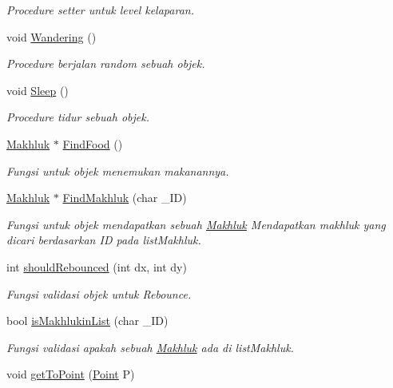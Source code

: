\begin{DoxyCompactItemize}
\begin{DoxyCompactList}\small\item\em Procedure setter untuk level kelaparan. \end{DoxyCompactList}\item 
void \hyperlink{class_hewan_a8268bfb533b9becb62e2bd8eee2e7960}{Wandering} ()
\begin{DoxyCompactList}\small\item\em Procedure berjalan random sebuah objek. \end{DoxyCompactList}\item 
void \hyperlink{class_hewan_ad1ba348d0912e3e392e41ae0c197c69b}{Sleep} ()
\begin{DoxyCompactList}\small\item\em Procedure tidur sebuah objek. \end{DoxyCompactList}\item 
\hyperlink{class_makhluk}{Makhluk} $\ast$ \hyperlink{class_hewan_ab604462c6b9c235f9d53d42235acd41b}{Find\+Food} ()
\begin{DoxyCompactList}\small\item\em Fungsi untuk objek menemukan makanannya. \end{DoxyCompactList}\item 
\hyperlink{class_makhluk}{Makhluk} $\ast$ \hyperlink{class_hewan_a7d89c8d0bee799698b986159c67f6bb3}{Find\+Makhluk} (char \+\_\+\+ID)
\begin{DoxyCompactList}\small\item\em Fungsi untuk objek mendapatkan sebuah \hyperlink{class_makhluk}{Makhluk}  Mendapatkan makhluk yang dicari berdasarkan ID pada list\+Makhluk. \end{DoxyCompactList}\item 
int \hyperlink{class_hewan_af4ae28e9179a2438a666b26e1882139d}{should\+Rebounced} (int dx, int dy)
\begin{DoxyCompactList}\small\item\em Fungsi validasi objek untuk Rebounce. \end{DoxyCompactList}\item 
bool \hyperlink{class_hewan_a3798162fd7aa8cfef947abce00c283ef}{is\+Makhlukin\+List} (char \+\_\+\+ID)
\begin{DoxyCompactList}\small\item\em Fungsi validasi apakah sebuah \hyperlink{class_makhluk}{Makhluk} ada di list\+Makhluk. \end{DoxyCompactList}\item 
void \hyperlink{class_hewan_a5420deb2ff65c6cedd5c80f1f3d42d00}{get\+To\+Point} (\hyperlink{class_point}{Point} P)

\end{DoxyCompactItemize}
